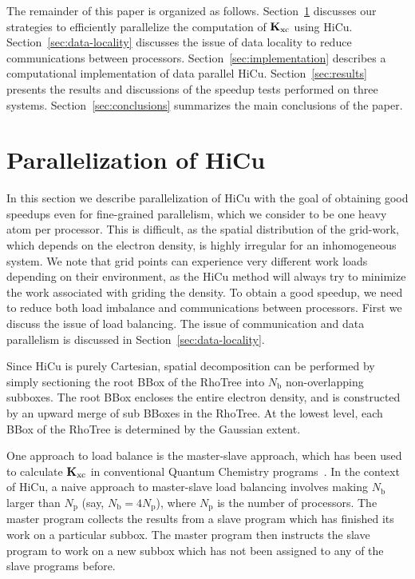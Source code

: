 \commentoutA{\documentclass[prl,aps,twocolumn,showpacs,twocolumngrid,superbib]{revtex4}}
\newcommand{\Kxc}{{\bf K}_{\mathrm{xc}}}
\newcommand{\Np}{N_{\mathrm{p}}} \newcommand{\Nbox}{N_{\mathrm{b}}}
\begin{document}
The remainder of this paper is organized as follows.
Section~\ref{sec:parahicu} discusses our strategies to efficiently
parallelize the computation of $\Kxc$ using HiCu.
Section~\ref{sec:data-locality} discusses the issue of data locality
to reduce communications between processors.
Section~\ref{sec:implementation} describes a computational
implementation of data parallel HiCu.  Section~\ref{sec:results}
presents the results and discussions of the speedup tests performed on
three systems. Section~\ref{sec:conclusions} summarizes the main
conclusions of the paper.

\section{Parallelization of HiCu}
\label{sec:parahicu}
In this section we describe parallelization of HiCu with the goal of
obtaining good speedups even for fine-grained parallelism, which we
consider to be one heavy atom per processor.  This is difficult, as
the spatial distribution of the grid-work, which depends on the
electron density, is highly irregular for an inhomogeneous system.  We
note that grid points can experience very different work loads
depending on their environment, as the HiCu method will always try to
minimize the work associated with griding the density.  To obtain a
good speedup, we need to reduce both load imbalance and communications
between processors. First we discuss the issue of load balancing. The
issue of communication and data parallelism is discussed in
Section~\ref{sec:data-locality}.

Since HiCu is purely Cartesian, spatial decomposition can be performed
by simply sectioning the root BBox of the RhoTree into $\Nbox$
non-overlapping subboxes.  The root BBox encloses the entire electron
density, and is constructed by an upward merge of sub BBoxes in the
RhoTree.  At the lowest level, each BBox of the RhoTree is determined
by the Gaussian extent.

One approach to load balance is the master-slave approach, which has
been used to calculate $\Kxc$ in conventional Quantum Chemistry
programs~\cite{Baker_02v23,Furlani_00v128,Yoshihiro_01v346}.  In the context of HiCu, 
a naive approach to master-slave load balancing involves making
$\Nbox$ larger than $\Np$ (say, $\Nbox= 4\Np$), where $\Np$ is the
number of processors. The master program collects the results from a
slave program which has finished its work on a particular subbox. The
master program then instructs the slave program to work on a new
subbox which has not been assigned to any of the slave programs
before.
\end{document}
